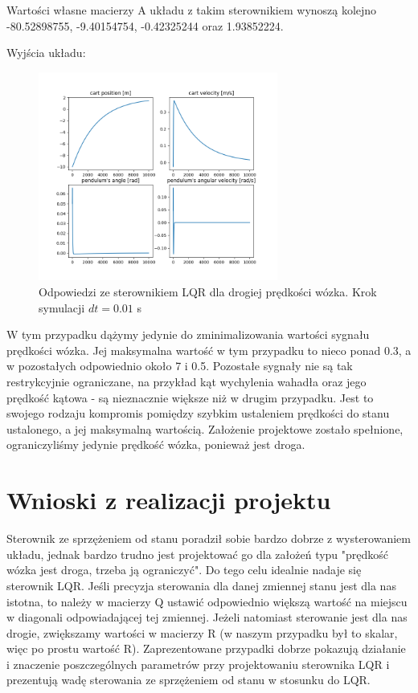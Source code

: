 \documentclass{article}
\begin{document}
Wartości własne macierzy A układu z takim sterownikiem wynoszą kolejno -80.52898755, -9.40154754, -0.42325244 oraz 1.93852224.

Wyjścia układu:
\begin{figure}[H]
    \centering
    \includegraphics[width=0.7\textwidth]{img/trzeci.png}
    \caption{Odpowiedzi ze sterownikiem LQR dla drogiej prędkości wózka. Krok symulacji $dt=0.01$ s}
    \label{fig:state_space}
\end{figure}

W tym przypadku dążymy jedynie do zminimalizowania wartości sygnału prędkości wózka. Jej maksymalna wartość w tym przypadku to nieco ponad 0.3, a w pozostałych odpowiednio około 7 i 0.5. Pozostałe sygnały nie są tak restrykcyjnie ograniczane, na przykład kąt wychylenia wahadła oraz jego prędkość kątowa - są nieznacznie większe niż w drugim przypadku. Jest to swojego rodzaju kompromis pomiędzy szybkim ustaleniem prędkości do stanu ustalonego, a jej maksymalną wartością. Założenie projektowe zostało spełnione, ograniczyliśmy jedynie prędkość wózka, ponieważ jest droga.

\section{Wnioski z realizacji projektu}
Sterownik ze sprzężeniem od stanu poradził sobie bardzo dobrze z wysterowaniem układu, jednak bardzo trudno jest projektować go dla założeń typu "prędkość wózka jest droga, trzeba ją ograniczyć". Do tego celu idealnie nadaje się sterownik LQR. Jeśli precyzja sterowania dla danej zmiennej stanu jest dla nas istotna, to należy w macierzy Q ustawić odpowiednio większą wartość na miejscu w diagonali odpowiadającej tej zmiennej. Jeżeli natomiast sterowanie jest dla nas drogie, zwiększamy wartości w macierzy R (w naszym przypadku był to skalar, więc po prostu wartość R). Zaprezentowane przypadki dobrze pokazują działanie i znaczenie poszczególnych parametrów przy projektowaniu sterownika LQR i prezentują wadę sterowania ze sprzężeniem od stanu w stosunku do LQR.
\end{document}
